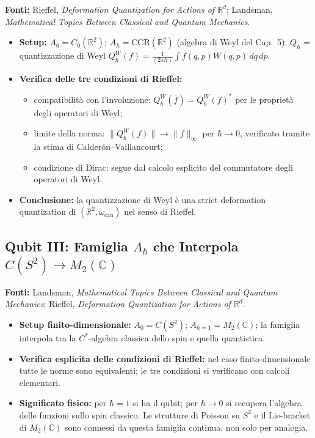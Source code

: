 \documentclass[12pt, a4paper]{article}
\newcommand{\fonti}[1]{%
	\begin{fontebox}
		\textcolor{fontecolor}{\footnotesize\textbf{Fonti:} #1}
	\end{fontebox}%
}
\begin{document}
	\fonti{Rieffel, \textit{Deformation Quantization for Actions of $\mathbb{R}^d$};
		Landsman, \textit{Mathematical Topics Between Classical and Quantum Mechanics}.}
	
	\begin{itemize}
		\item \textbf{Setup:} $A_0 = C_0(\mathbb{R}^2)$; $A_\hbar = \mathrm{CCR}(\mathbb{R}^2)$
		(algebra di Weyl del Cap.\ 5); $Q_\hbar$ = quantizzazione di Weyl
		$Q_\hbar^W(f) = \frac{1}{(2\pi\hbar)}\int f(q,p) W(q,p)\, dq\, dp$.
		\item \textbf{Verifica delle tre condizioni di Rieffel:}
		\begin{itemize}
			\item[(i)] compatibilità con l'involuzione: $Q_\hbar^W(\bar{f}) = Q_\hbar^W(f)^*$
			per le proprietà degli operatori di Weyl;
			\item[(ii)] limite della norma: $\|Q_\hbar^W(f)\| \to \|f\|_\infty$ per
			$\hbar \to 0$, verificato tramite la stima di Calderón--Vaillancourt;
			\item[(iii)] condizione di Dirac: segue dal calcolo esplicito del commutatore
			degli operatori di Weyl.
		\end{itemize}
		\item \textbf{Conclusione:} la quantizzazione di Weyl è una strict deformation
		quantization di $(\mathbb{R}^2, \omega_{\mathrm{can}})$ nel senso di Rieffel.
	\end{itemize}
	
	\subsection{Qubit III: Famiglia $A_\hbar$ che Interpola $C(S^2) \to M_2(\mathbb{C})$}
	
	\fonti{Landsman, \textit{Mathematical Topics Between Classical and Quantum Mechanics};
		Rieffel, \textit{Deformation Quantization for Actions of $\mathbb{R}^d$}.}
	
	\begin{itemize}
		\item \textbf{Setup finito-dimensionale:} $A_0 = C(S^2)$;
		$A_{\hbar=1} = M_2(\mathbb{C})$; la famiglia interpola tra la $C^*$-algebra
		classica dello spin e quella quantistica.
		\item \textbf{Verifica esplicita delle condizioni di Rieffel:} nel caso
		finito-dimensionale tutte le norme sono equivalenti; le tre condizioni si
		verificano con calcoli elementari.
		\item \textbf{Significato fisico:} per $\hbar = 1$ si ha il qubit; per $\hbar \to 0$
		si recupera l'algebra delle funzioni sullo spin classico. Le strutture di
		Poisson su $S^2$ e il Lie-bracket di $M_2(\mathbb{C})$ sono connessi da questa
		famiglia continua, non solo per analogia.
	\end{itemize}
	
\end{document}

